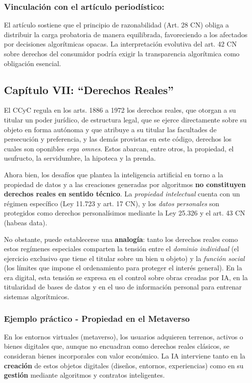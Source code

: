 \documentclass[10pt, a4paper]{article}
\begin{document}
\subsubsection*{Vinculación con el artículo periodístico:}
El artículo sostiene que el principio de razonabilidad (Art. 28 CN) obliga a distribuir la carga probatoria de manera equilibrada, favoreciendo a los afectados por decisiones algorítmicas opacas. La interpretación evolutiva del art. 42 CN sobre derechos del consumidor podría exigir la transparencia algorítmica como obligación esencial.

\subsection{Capítulo VII: ``Derechos Reales''}
\label{subsec:derechos_reales}

El CCyC regula en los arts. 1886 a 1972 los derechos reales, que otorgan a su titular un poder jurídico, de estructura legal, que se ejerce directamente sobre su objeto en forma autónoma y que atribuye a su titular las facultades de persecución y preferencia, y las demás provistas en este código, derechos los cuales son oponibles \textit{erga omnes}. Estos abarcan, entre otros, la propiedad, el usufructo, la servidumbre, la hipoteca y la prenda.  

Ahora bien, los desafíos que plantea la inteligencia artificial en torno a la propiedad de datos y a las creaciones generadas por algoritmos \textbf{no constituyen derechos reales en sentido técnico}. La \textit{propiedad intelectual} cuenta con un régimen específico (Ley 11.723 y art. 17 CN), y los \textit{datos personales} son protegidos como derechos personalísimos mediante la Ley 25.326 y el art. 43 CN (habeas data).  

No obstante, puede establecerse una \textbf{analogía}: tanto los derechos reales como estos regímenes especiales comparten la tensión entre el \textit{dominio individual} (el ejercicio exclusivo que tiene el titular sobre un bien u objeto) y la \textit{función social} (los límites que impone el ordenamiento para proteger el interés general). En la era digital, esta tensión se expresa en el control sobre obras creadas por IA, en la titularidad de bases de datos y en el uso de información personal para entrenar sistemas algorítmicos.  

\subsubsection*{Ejemplo práctico - Propiedad en el Metaverso}
En los entornos virtuales (metaverso), los usuarios adquieren terrenos, activos o bienes digitales que, aunque no encuadran como derechos reales clásicos, se consideran bienes incorporales con valor económico. La IA interviene tanto en la \textbf{creación} de estos objetos digitales (diseños, entornos, experiencias) como en su \textbf{gestión} mediante algoritmos y contratos inteligentes.  
\end{document}
